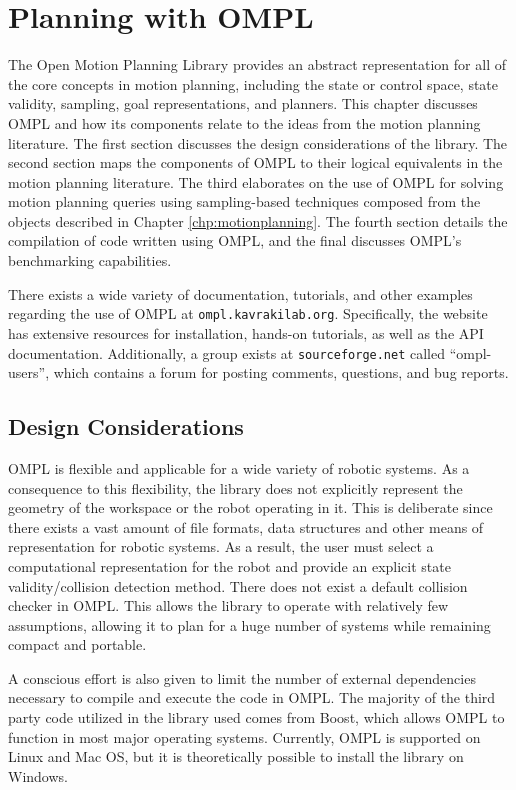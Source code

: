 \chapter {Planning with OMPL}
\label {chp:ompl}

The Open Motion Planning Library provides an abstract representation for all
of the core concepts in motion planning, including the state or control space,
state validity, sampling, goal representations, and planners.  This chapter
discusses OMPL and how its components relate to the ideas from the motion
planning literature.  The first section discusses the design considerations of 
the library.  The second section maps the components of OMPL to their logical
equivalents in the motion planning literature.  The third elaborates on the
use of OMPL for solving motion planning queries using sampling-based techniques
composed from the objects described in Chapter \ref{chp:motionplanning}.  The 
fourth section details the compilation of code written using OMPL, and the final
discusses OMPL's benchmarking capabilities.

There exists a wide variety of documentation, tutorials, and other examples 
regarding the use of OMPL at {\tt ompl.kavrakilab.org}.  Specifically, the
website has extensive resources for installation, hands-on tutorials, as well
as the API documentation.  Additionally, a group exists at {\tt sourceforge.net}
called ``ompl-users'', which contains a forum for posting comments, questions,
and bug reports.

\section {Design Considerations}
OMPL is flexible and applicable for a wide variety of robotic systems.  As a 
consequence to this flexibility, the library does not explicitly represent the
geometry of the workspace or the robot operating in it.  This is deliberate
since there exists a vast amount of file formats, data structures and other 
means of representation for robotic systems.  As a result, the user must select
a computational representation for the robot and provide an explicit state 
validity/collision detection method.  There does not exist a default collision 
checker in OMPL.  This allows the library to operate with relatively few 
assumptions, allowing it to plan for a huge number of systems while remaining 
compact and portable.

A conscious effort is also given to limit the number of external dependencies
necessary to compile and execute the code in OMPL.  The majority of the third 
party code utilized in the library used comes from Boost, which allows OMPL to 
function in most major operating systems.  Currently, OMPL is supported on Linux
and Mac OS, but it is theoretically possible to install the library on Windows.

